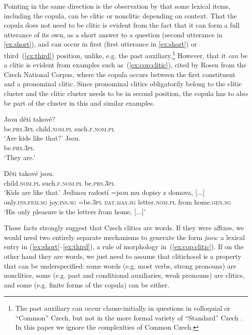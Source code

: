 \documentclass[output=paper]{langsci/langscibook}
\begin{document}
Pointing in the same direction is the observation by \citet[210]{Rosen01} that some lexical items, including the copula, can be clitic or nonclitic depending on context. That the copula does not need to be clitic is evident from the fact that it can form a full utterance of its own, as a short answer to a question (second utterance in \ref{ex:short}), and can occur in first (first utterance  in \ref{ex:short}) or third~(\ref{ex:third}) position, unlike, e.g. the past auxiliary.\footnote{The past auxiliary can occur clause-initially in questions in colloquial or ``Common'' Czech, but not in the more formal variety of ``Standard'' Czech \citep[70]{Hana07}. In this paper we ignore the complexities of Common Czech.} However, that it \emph{can} be a clitic is evident from examples such as~(\ref{ex:cop:clitic}), cited by Rosen from the Czech National Corpus, where the copula occurs between the first constituent and a pronominal clitic. Since pronominal clitics obligatorily belong to the clitic cluster and the clitic cluster needs to be in second position, the copula has to also be part of the cluster in this and similar examples.

\begin{exe}
\ex\label{ex:short}\begin{xlist}
\gll Jsou děti  takové?\\ 
be.\textsc{prs.3pl} child.\textsc{nom.pl} such.\textsc{f.nom.pl}\\
\glt `Are kids like that?'
\gll Jsou.\\ be.\textsc{prs.3pl}\\ `They are.'
\end{xlist}
\ex\label{ex:third} 
\gll Děti takové jsou.\\
child.\textsc{nom.pl}  such.\textsc{f.nom.pl} be.\textsc{prs.3pl}\\
\glt `Kids are like that.'
\ex\label{ex:cop:clitic}\gll
Jedinou radostí =jsou mu dopisy z domova, [...]\\
only.\textsc{ins.fem.sg} joy.\textsc{ins.sg} =be.\textsc{3pl} \textsc{dat.mas.sg} letter.\textsc{nom.pl} from home.\textsc{gen.sg}\\
\glt `His only pleasure is the letters from home, [...]’
\end{exe}

These facts strongly suggest that Czech clitics are words. If they were  affixes, we would need two entirely separate mechanisms to generate the form \emph{jsou}: a lexical entry in (\ref{ex:short}--\ref{ex:third}), a rule of morphology in~(\ref{ex:cop:clitic}). If on the other hand they are words, we just need to assume that clitichood is a property that can be underspecified: some words (e.g. most verbs, strong pronouns) are nonclitics, some (e.g. past and conditional auxiliaries, weak pronouns) are clitics, and some (e.g. finite forms of the copula) can be either.
\end{document}
